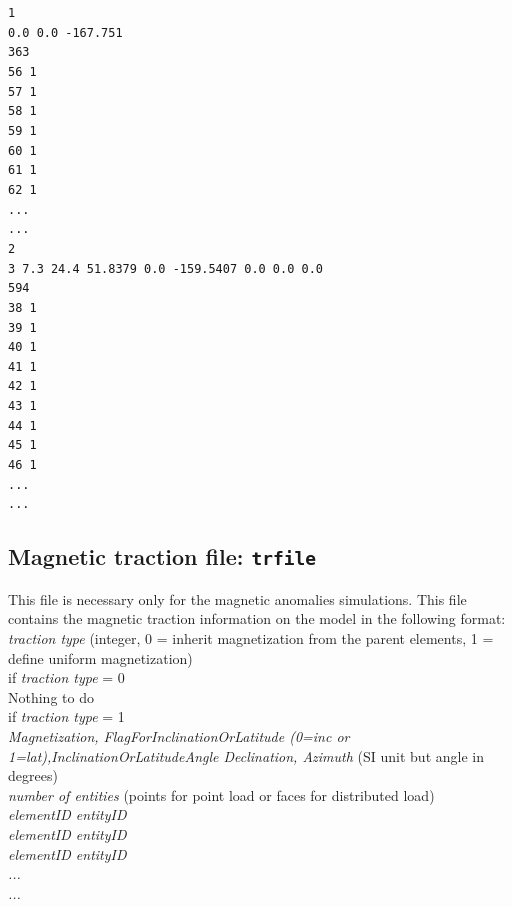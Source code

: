 \texttt{1\\
0.0 0.0 -167.751\\
363\\
56 1\\
57 1\\
58 1\\
59 1\\
60 1\\
61 1\\
62 1\\
...\\
...\\
2\\
3 7.3 24.4 51.8379 0.0 -159.5407 0.0 0.0 0.0\\
594\\
38 1\\
39 1\\
40 1\\
41 1\\
42 1\\
43 1\\
44 1\\
45 1\\
46 1\\
...\\
...}\\

\subsection{Magnetic traction file: \texttt{trfile}}

This file is necessary only for the magnetic anomalies simulations. This file contains the magnetic traction information on the model in the following format:\\

\emph{traction type} (integer, 0 = inherit magnetization from the parent elements, 1 = define uniform magnetization)\\
if \emph{traction type} = 0\\
  Nothing to do\\
if \emph{traction type} = 1\\
  \emph{Magnetization, FlagForInclinationOrLatitude (0=inc or 1=lat),InclinationOrLatitudeAngle Declination, Azimuth} (SI unit but angle in degrees)\\
\emph{number of entities} (points for point load or faces for distributed load)\\
\emph{elementID entityID \\
elementID entityID \\
elementID entityID \\
...\\
...\\}

